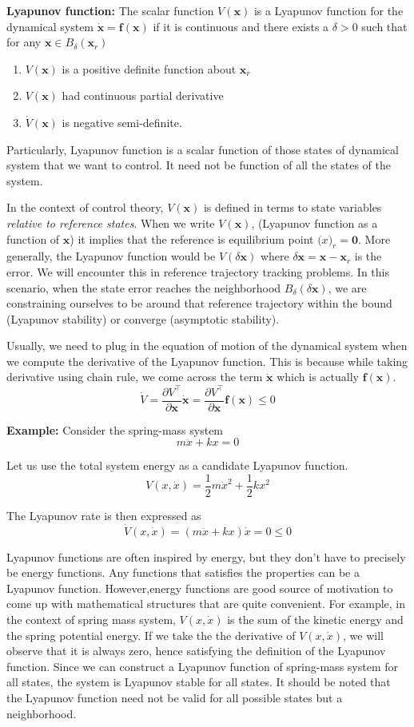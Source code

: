 \documentclass{article}
\begin{document}
\textbf{Lyapunov function:} The scalar function $V(\bm{x})$ is a Lyapunov function for the dynamical system $\dot{\bm{x}}=\bm{f}(\bm{x})$ if it is continuous and there exists a $\delta>0$ such that for any $\bm{x}\in B_{\delta}(\bm{x}_{r})$
\begin{enumerate}[noitemsep]
  \item $V(\bm{x})$ is a positive definite function about $\bm{x}_{r}$
  \item $V(\bm{x})$ had continuous partial derivative
  \item $\dot{V}(\bm{x})$ is negative semi-definite.
\end{enumerate}

Particularly, Lyapunov function is a scalar function of those states of dynamical system that we want to control. It need not be function of all the states of the system. 

In the context of control theory, $V(\bm{x})$ is defined in terms to state variables \textit{relative to reference states}. When we write $V(\bm{x})$, (Lyapunov function as a function of $\bm{x}$) it implies that the reference is equilibrium point $\bm(x)_{r}=\bm{0}$. More generally, the Lyapunov function would be $V(\delta\bm{x})$ where $\delta\bm{x}=\bm{x}-\bm{x}_{r}$ is the error. We will encounter this in reference trajectory tracking problems. In this scenario, when the state error reaches the neighborhood $B_{\delta}(\delta\bm{x})$, we are constraining ourselves to be around that reference trajectory within the bound (Lyapunov stability) or converge (asymptotic stability).

Usually, we need to plug in the equation of motion of the dynamical system when we compute the derivative of the Lyapunov function. This is because while taking derivative using chain rule, we come across the term $\dot{\bm{x}}$ which is actually $\bm{f}(\bm{x})$.
$$
\dot{V}
=\frac{\partial V^{\intercal}}{\partial\bm{x}}\dot{\bm{x}} 
=\frac{\partial V^{\intercal}}{\partial\bm{x}}\bm{f}(\bm{x})\leq0
$$

\noindent
\textbf{Example:} Consider the spring-mass system
$$
m\ddot{x}+kx=0
$$

Let us use the total system energy as a candidate Lyapunov function.
$$
V(x,\dot{x}) = \frac{1}{2}m\dot{x}^{2}+\frac{1}{2}kx^{2}
$$

The Lyapunov rate is then expressed as
$$
\dot{V}(x,\dot{x}) = (m\ddot{x}+kx)\dot{x}=0\leq0
$$

Lyapunov functions are often inspired by energy, but they don't have to precisely be energy functions. Any functions that satisfies the properties can be a Lyapunov function. However,energy functions are good source of motivation to come up with mathematical structures that are quite convenient. For example, in the context of spring mass system, $V(x,\dot{x})$ is the sum of the kinetic energy and the spring potential energy. If we take the the derivative of $V(x,\dot{x})$, we will observe that it is always zero, hence satisfying the definition of the Lyapunov function. Since we can construct a Lyapunov function of spring-mass system for all states, the system is Lyapunov stable for all states. It should be noted that the Lyapunov function need not be valid for all possible states but a neighborhood.
\end{document}
